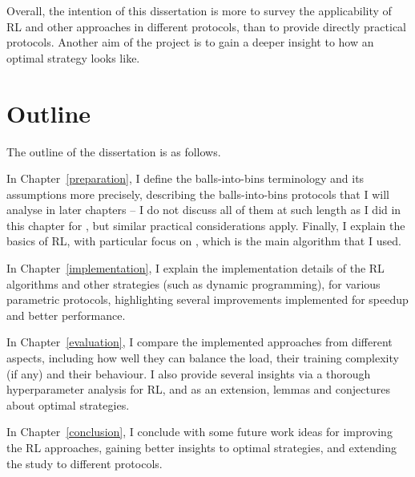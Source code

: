 Overall, the intention of this dissertation is more to survey the applicability of RL and other approaches in different protocols, than to provide directly practical protocols. Another aim of the project is to gain a deeper insight to how an optimal strategy looks like.




\section{Outline}

The outline of the dissertation is as follows.


In Chapter~\ref{preparation}, I define the balls-into-bins terminology and its assumptions more precisely, describing the balls-into-bins protocols that I will analyse in later chapters -- I do not discuss all of them at such length as I did in this chapter for \TwoThinning, but similar practical considerations apply. Finally, I explain the basics of RL, with particular focus on \DQL, which is the main algorithm that I used.


In Chapter~\ref{implementation}, I explain the implementation details of the RL algorithms and other strategies (such as dynamic programming), for various parametric protocols, highlighting several improvements implemented for speedup and better performance.


In Chapter~\ref{evaluation}, I compare the implemented approaches from different aspects, including how well they can balance the load, their training complexity (if any) and their behaviour. I also provide several insights via a thorough hyperparameter analysis for RL, and as an extension, lemmas and conjectures about optimal strategies.

In Chapter~\ref{conclusion}, I conclude with some future work ideas for improving the RL approaches, gaining better insights to optimal strategies, and extending the study to different protocols.